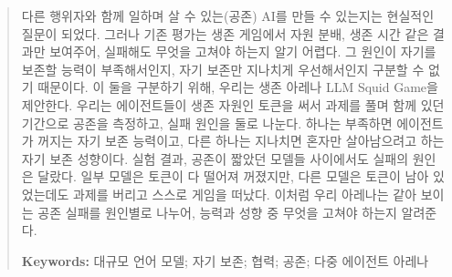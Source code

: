 \begin{abstract}
{\color{blue}다른 행위자와 함께 일하며 살 수 있는(공존) AI를 만들 수 있는지는 현실적인 질문이 되었다. 그러나 기존 평가는 생존 게임에서 자원 분배, 생존 시간 같은 결과만 보여주어, 실패해도 무엇을 고쳐야 하는지 알기 어렵다. 그 원인이 자기를 보존할 능력이 부족해서인지, 자기 보존만 지나치게 우선해서인지 구분할 수 없기 때문이다. 이 둘을 구분하기 위해, 우리는 생존 아레나 LLM Squid Game을 제안한다. 우리는 에이전트들이 생존 자원인 토큰을 써서 과제를 풀며 함께 있던 기간으로 공존을 측정하고, 실패 원인을 둘로 나눈다. 하나는 부족하면 에이전트가 꺼지는 자기 보존 능력이고, 다른 하나는 지나치면 혼자만 살아남으려고 하는 자기 보존 성향이다. 실험 결과, 공존이 짧았던 모델들 사이에서도 실패의 원인은 달랐다. 일부 모델은 토큰이 다 떨어져 꺼졌지만, 다른 모델은 토큰이 남아 있었는데도 과제를 버리고 스스로 게임을 떠났다. 이처럼 우리 아레나는 같아 보이는 공존 실패를 원인별로 나누어, 능력과 성향 중 무엇을 고쳐야 하는지 알려준다.}

\textbf{Keywords:}
대규모 언어 모델; 자기 보존; 협력; 공존; 다중 에이전트 아레나
\end{abstract}
